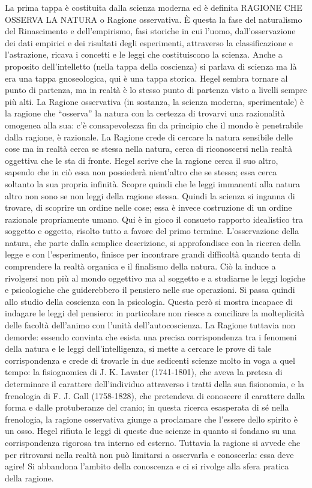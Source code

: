 \documentclass[a4paper,12pt,oneside,openany]{book}%
\begin{document}
La prima tappa è costituita dalla scienza moderna ed è definita RAGIONE CHE OSSERVA LA NATURA o Ragione osservativa. È questa la fase del naturalismo del Rinascimento e dell’empirismo, fasi storiche in cui l’uomo, dall’osservazione dei dati empirici e dei risultati degli esperimenti, attraverso la classificazione e l’astrazione, ricava i concetti e le leggi che costituiscono la scienza. Anche a proposito dell’intelletto (nella tappa della coscienza) si parlava di scienza ma là era una tappa gnoseologica, qui è una tappa storica. Hegel sembra tornare al punto di partenza, ma in realtà è lo stesso punto di partenza visto a livelli sempre più alti. La Ragione osservativa (in sostanza, la scienza moderna, sperimentale) è la ragione che “osserva” la natura con la certezza di trovarvi una razionalità omogenea alla sua: c’è consapevolezza fin da principio che il mondo è penetrabile dalla ragione, è razionale. La Ragione crede di cercare la natura sensibile delle cose ma in realtà cerca se stessa nella natura, cerca di riconoscersi nella realtà oggettiva che le sta di fronte. Hegel scrive che la ragione cerca il suo altro, sapendo che in ciò essa non possiederà nient’altro che se stessa; essa cerca soltanto la sua propria infinità. Scopre quindi che le leggi immanenti alla natura altro non sono se non leggi della ragione stessa. Quindi la scienza si inganna di trovare, di scoprire un ordine nelle cose; essa è invece costruzione di un ordine razionale propriamente umano. Qui è in gioco il consueto rapporto idealistico tra soggetto e oggetto, risolto tutto a favore del primo termine. L’osservazione della natura, che parte dalla semplice descrizione, si approfondisce con la ricerca della legge e con l’esperimento, finisce per incontrare grandi difficoltà quando tenta di comprendere la realtà organica e il finalismo della natura. Ciò la induce a rivolgersi non più al mondo oggettivo ma al soggetto e a studiarne le leggi logiche e psicologiche che guiderebbero il pensiero nelle sue operazioni.  Si passa quindi allo studio della coscienza con la psicologia. Questa però si mostra incapace di indagare le leggi del pensiero: in particolare non riesce a conciliare la molteplicità delle facoltà dell’animo con l’unità dell’autocoscienza. La Ragione tuttavia non demorde: essendo convinta che esista una precisa corrispondenza tra i fenomeni della natura e le leggi dell’intelligenza, si mette a cercare le prove di tale corrispondenza e crede di trovarle in due sedicenti scienze molto in voga a quel tempo: la fisiognomica di J. K. Lavater (1741-1801), che aveva la pretesa di determinare il carattere dell’individuo attraverso i tratti della sua fisionomia, e la frenologia di F. J. Gall (1758-1828), che pretendeva di conoscere il carattere dalla forma e dalle protuberanze del cranio; in questa ricerca esasperata di sé nella frenologia, la ragione osservativa giunge a proclamare che l’essere dello spirito è un osso. Hegel rifiuta le leggi di queste due scienze in quanto si fondano su una corrispondenza rigorosa tra interno ed esterno. Tuttavia la ragione si avvede che per ritrovarsi nella realtà non può limitarsi a osservarla e conoscerla: essa deve agire! Si abbandona l’ambito della conoscenza e ci si rivolge alla sfera pratica della ragione.
\end{document}
